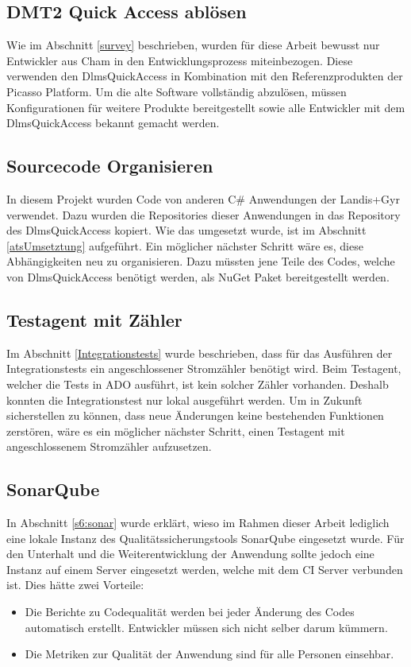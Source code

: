 \subsection{\ac{DMT2} Quick Access ablösen}
Wie im Abschnitt \ref{survey} beschrieben, wurden für diese Arbeit bewusst nur Entwickler aus Cham in den Entwicklungsprozess miteinbezogen.
Diese verwenden den DlmsQuickAccess in Kombination mit den Referenzprodukten der Picasso Platform.
Um die alte Software vollständig abzulösen, müssen Konfigurationen für weitere Produkte bereitgestellt sowie alle Entwickler mit dem DlmsQuickAccess bekannt gemacht werden.


\subsection{Sourcecode Organisieren}\label{ausblick:ats_split}
In diesem Projekt wurden Code von anderen C\# Anwendungen der Landis+Gyr verwendet.
Dazu wurden die Repositories dieser Anwendungen in das Repository des DlmsQuickAccess kopiert.
Wie das umgesetzt wurde, ist im Abschnitt \ref{atsUmsetztung} aufgeführt. 
Ein möglicher nächster Schritt wäre es, diese Abhängigkeiten neu zu organisieren.
Dazu müssten jene Teile des Codes, welche von DlmsQuickAccess benötigt werden, als NuGet Paket bereitgestellt werden.


\subsection{Testagent mit Zähler}
Im Abschnitt \ref{Integrationstests} wurde beschrieben, dass für das Ausführen der Integrationstests ein angeschlossener Stromzähler benötigt wird.
Beim Testagent, welcher die Tests in \ac{ADO} ausführt, ist kein solcher Zähler vorhanden.
Deshalb konnten die Integrationstest nur lokal ausgeführt werden.
Um in Zukunft sicherstellen zu können, dass neue Änderungen keine bestehenden Funktionen zerstören, wäre es ein möglicher nächster Schritt, einen Testagent mit angeschlossenem Stromzähler aufzusetzen.

\subsection{SonarQube}
In Abschnitt \ref{s6:sonar} wurde erklärt, wieso im Rahmen dieser Arbeit lediglich eine lokale Instanz des Qualitätssicherungstools SonarQube eingesetzt wurde.
Für den Unterhalt und die Weiterentwicklung der Anwendung sollte jedoch eine Instanz auf einem Server eingesetzt werden, welche mit dem \ac{CI} Server verbunden ist.
Dies hätte zwei Vorteile:
\begin{itemize}
   \item Die Berichte zu Codequalität werden bei jeder Änderung des Codes automatisch erstellt. 
Entwickler müssen sich nicht selber darum kümmern.
   \item Die Metriken zur Qualität der Anwendung sind für alle Personen einsehbar.
\end{itemize}



